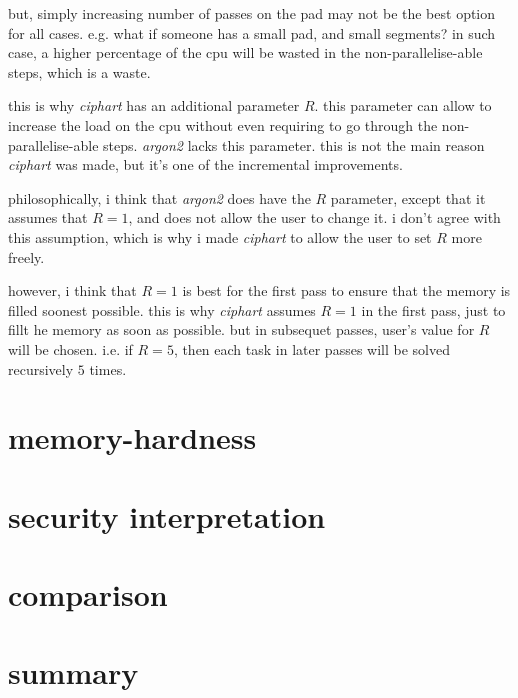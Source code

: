 \documentclass[twocolumn]{article}
\begin{document}
but, simply increasing number of passes on the pad may not be the best
option for all cases.  e.g. what if someone has a small pad, and small
segments?  in such case, a higher percentage of the cpu will be wasted in
the non-parallelise-able steps, which is a waste.

this is why \emph{ciphart} has an additional parameter $R$.  this parameter
can allow to increase the load on the cpu without even requiring to go
through the non-parallelise-able steps.  \emph{argon2} lacks this
parameter.  this is not the main reason \emph{ciphart} was made, but it's
one of the incremental improvements.

philosophically, i think that \emph{argon2} does have the $R$ parameter,
except that it assumes that $R=1$, and does not allow the user to change
it.  i don't agree with this assumption, which is why i made \emph{ciphart}
to allow the user to set $R$ more freely.

however, i think that $R=1$ is best for the first pass to ensure that the
memory is filled soonest possible.  this is why \emph{ciphart} assumes
$R=1$ in the first pass, just to fillt he memory as soon as possible.  but
in subsequet passes, user's value for $R$ will be chosen.  i.e. if $R=5$,
then each task in later passes will be solved recursively $5$ times.

\section{memory-hardness}
\section{security interpretation}
\section{comparison}
\section{summary}
\end{document}
